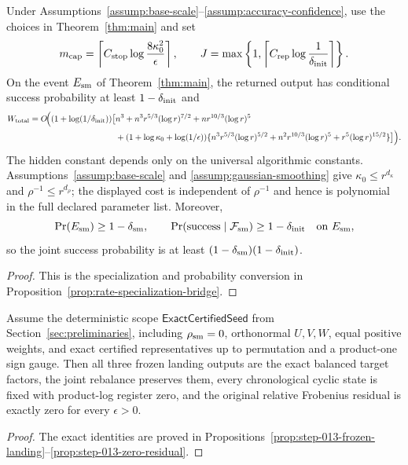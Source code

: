 \begin{corollary}
\label{cor:rate-specialization-bridge}
Under Assumptions~\ref{assump:base-scale}--\ref{assump:accuracy-confidence},
use the choices in Theorem~\ref{thm:main} and set
\[
 m_{\rm cap}=\left\lceil C_{\rm stop}
 \log\frac{8\kappa _0^2}{\epsilon}\right\rceil,
 \qquad
 J=\max\left\{1,
 \left\lceil C_{\rm rep}\log\frac1{\delta_{\rm init}}\right\rceil\right\}.
\]
On the event $E_{\rm sm}$ of Theorem~\ref{thm:main}, the returned output has
conditional success probability at least $1-\delta_{\rm init}$ and
\[
\begin{aligned}
W_{\rm total}=O\!\Big((1+\log(1/\delta_{\rm init}))\big[&n^3
+n^3r^{5/3}(\log r)^{7/2}+nr^{10/3}(\log r)^5\\
&+(1+\log\kappa _0+\log(1/\epsilon))
\{n^3r^{5/3}(\log r)^{5/2}
+n^2r^{10/3}(\log r)^5+r^5(\log r)^{15/2}\}\big]\Big).
\end{aligned}
\]
The hidden constant depends only on the universal algorithmic constants.
Assumptions~\ref{assump:base-scale} and
\ref{assump:gaussian-smoothing} give
$\kappa _0\le r^{d_\kappa}$ and $\rho^{-1}\le r^{d_\rho}$; the displayed
cost is independent of $\rho^{-1}$ and hence is polynomial in the full
declared parameter list. Moreover,
\[
 \Pr(E_{\rm sm})\ge1-\delta_{\rm sm},\qquad
 \Pr(\mathrm{success}\mid\mathcal F_{\rm sm})\ge1-\delta_{\rm init}
 \quad\text{on }E_{\rm sm},
\]
so the joint success probability is at least
$(1-\delta_{\rm sm})(1-\delta_{\rm init})$.
\end{corollary}

\begin{proof}
This is the specialization and probability conversion in
Proposition~\ref{prop:rate-specialization-bridge}.
\end{proof}

\begin{corollary}
\label{cor:exact-certified-seed}
Assume the deterministic scope $\mathsf{ExactCertifiedSeed}$ from
Section~\ref{sec:preliminaries}, including $\rho_{\rm sm}=0$, orthonormal
$U,V,W$, equal positive weights, and exact certified representatives up to
permutation and a product-one sign gauge. Then all three frozen landing
outputs are the exact balanced target factors, the joint rebalance preserves
them, every chronological cyclic state is fixed with product-log register
zero, and the original relative Frobenius residual is exactly zero for every
$\epsilon>0$.
\end{corollary}

\begin{proof}
The exact identities are proved in
Propositions~\ref{prop:step-013-frozen-landing}--\ref{prop:step-013-zero-residual}.
\end{proof}

